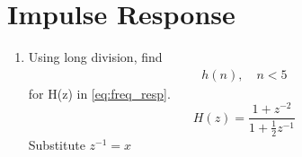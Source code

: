 \documentclass[journal,12pt,twocolumn]{IEEEtran}
\renewcommand\thesection{\arabic{section}}
\begin{document}
\section{Impulse Response}
\begin{enumerate}[label=\thesection.\arabic*]
\item Using long division, 
find
		\begin{align}
			h(n), \quad n < 5
		\end{align}
		for H(z) in 
		\eqref{eq:freq_resp}.\\
\solution  
	\begin{equation}
		H(z) = \frac{1 + z^{-2}}{1 + \frac12 z^{-1}}
	\end{equation}
	Substitute $z^{-1} = x$
	
	

\end{enumerate}
\end{document}
